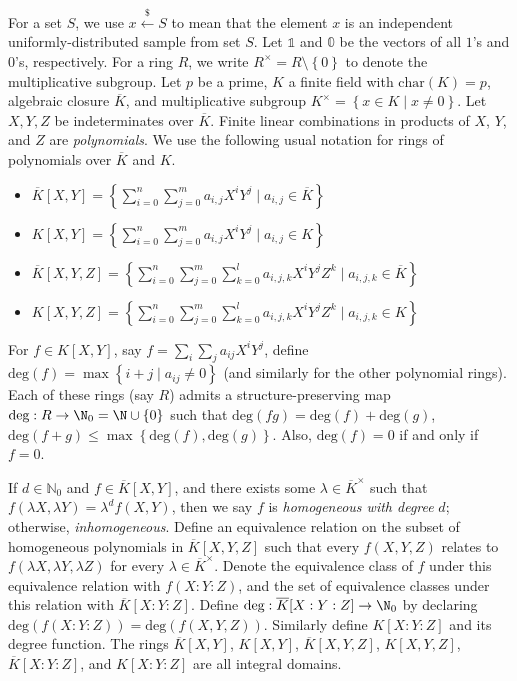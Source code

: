 \documentclass[11pt,letterpaper]{article}
\newcommand{\polys}{K[X,Y]}
\theoremstyle{definition}
\newcommand{\6}{\mathbf}
\newcommand{\7}{\mathcal}
\newcommand{\lsamp}{\xleftarrow{\$}}
\newcommand{\one}{\mathbb{1}}
\newcommand{\zero}{\mathbb{0}}
\begin{document}
For a set $S$, we use $x \lsamp S$ to mean that the element $x$ is an independent uniformly-distributed sample from set $S$.
Let $\one$ and $\zero$ be the vectors of all $1$'s and $0$'s, respectively.
For a ring $R$, we write $R^\times = R\setminus\left\{0\right\}$ to denote the multiplicative subgroup. 
Let $p$ be a prime, $K$ a finite field with $\text{char}(K) = p$, algebraic closure $\overline{K}$, and multiplicative subgroup $K^\times = \left\{x \in K \mid x \neq 0\right\}$. Let $X, Y, Z$ be indeterminates over $\overline{K}$. Finite linear combinations in products of $X$, $Y$, and $Z$ are \textit{polynomials}. We use the following usual notation for rings of polynomials over $\overline{K}$ and $K$.
\begin{itemize}

\item  $\overline{K}[X,Y] = \left\{\sum_{i=0}^{n}\sum_{j=0}^{m} a_{i,j} X^i Y^j \mid a_{i,j} \in \overline{K}\right\}$

\item $\polys = \left\{\sum_{i=0}^{n}\sum_{j=0}^{m}a_{i,j} X^iY^j \mid a_{i,j} \in K\right\}$

\item  $\overline{K}[X,Y,Z] = \left\{\sum_{i=0}^{n}\sum_{j=0}^{m} \sum_{k=0}^{l} a_{i,j,k} X^i Y^j Z^k \mid a_{i,j,k} \in \overline{K}\right\}$

\item $K[X,Y,Z] = \left\{\sum_{i=0}^{n}\sum_{j=0}^{m} \sum_{k=0}^{l} a_{i,j,k} X^i Y^j Z^k \mid a_{i,j,k} \in K\right\}$

\end{itemize}  

For $f \in \polys$, say $f = \sum_i \sum_j a_{ij} X^iY^j$, define $\text{deg}(f) = \max \left\{i+j \mid a_{ij} \neq 0\right\}$ (and similarly for the other polynomial rings). Each of these rings (say $R$) admits a structure-preserving map $\text{deg}:R \to \N_0 = \N \cup \left\{0\right\}$ such that $\text{deg}(fg) = \text{deg}(f) + \text{deg}(g)$, $\text{deg}(f+g) \leq \max\left\{\text{deg}(f), \text{deg}(g)\right\}$. Also, $\text{deg}(f) = 0$ if and only if $f = 0$.


If $d \in \mathbb{N}_0$ and $f \in \overline{K}[X,Y]$, and there exists some $\lambda \in \overline{K}^\times$ such that $f(\lambda X, \lambda Y) = \lambda^d f(X,Y)$, then we say $f$ is \textit{homogeneous with degree} $d$; otherwise, \textit{inhomogeneous}. Define an equivalence relation on the subset of homogeneous polynomials in $\overline{K}[X,Y,Z]$ such that every $f(X,Y,Z)$ relates to $f(\lambda X, \lambda Y, \lambda Z)$ for every $\lambda \in \overline{K}^\times$. Denote the equivalence class of $f$ under this equivalence relation with $f(X\!:\!Y\!:\!Z)$, and the set of equivalence classes under this relation with $\overline{K}[X\!:\!Y\!:\!Z]$.
Define $\text{deg}:\overline{K}[X:Y:Z] \to \N_0$ by declaring $\text{deg}(f(X\!:\!Y\!:\!Z)) = \text{deg}(f(X,Y,Z))$. Similarly define $K[X\!:\!Y\!:\!Z]$ and its degree function. The rings $\overline{K}[X,Y]$, $K[X,Y]$, $\overline{K}[X,Y,Z]$, $K[X,Y,Z]$, $\overline{K}[X\!:\!Y\!:\!Z]$, and $K[X\!:\!Y\!:\!Z]$ are all integral domains. 
\end{document}
